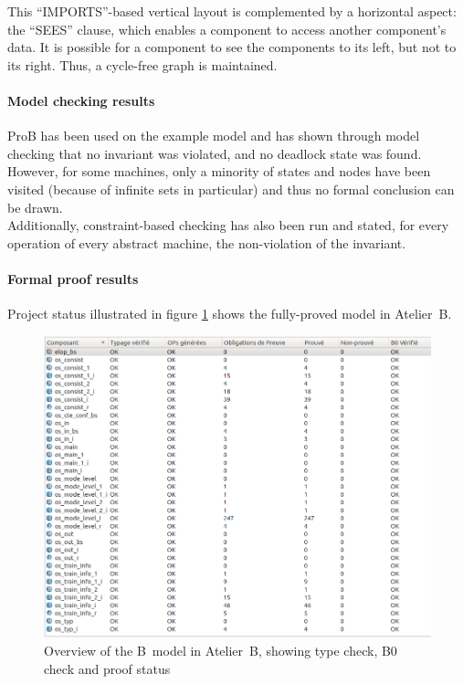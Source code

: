 This ``IMPORTS''-based vertical layout is complemented by a horizontal aspect: the ``SEES'' clause, which enables a component to access another component's data. It is possible for a component to see the components to its left, but not to its right. Thus, a cycle-free graph is maintained.
 
\paragraph{Model checking results}
\label{subapp:mc}
ProB has been used on the example model and has shown through model checking that no invariant was violated, and no deadlock state was found. However, for some machines, only a minority of states and nodes have been visited (because of infinite sets in particular) and thus no formal conclusion can be drawn.\\
Additionally, constraint-based checking has also been run and stated, for every operation of every abstract machine, the non-violation of the invariant.

\paragraph{Formal proof results}
\label{subapp:proof}

Project status illustrated in figure \ref{fig:atelierb} shows the fully-proved model in Atelier~B. 

\begin{figure}[h!]
\centering
\includegraphics[width=1\textwidth]{figures/atelierb}
\caption{Overview of the B~model in Atelier~B, showing type check, B0 check and proof status}
\label{fig:atelierb}
\end{figure}

